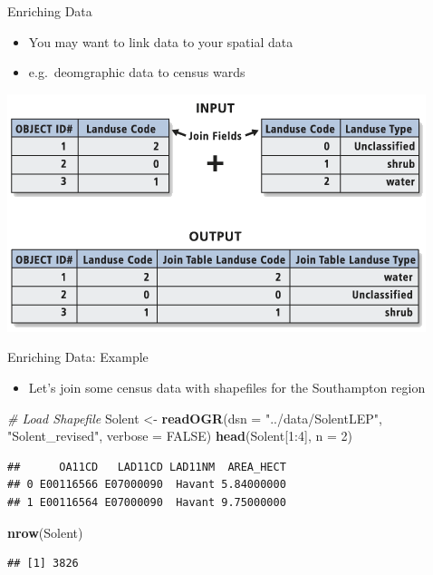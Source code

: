 \documentclass[10pt,ignorenonframetext,]{beamer}
\newenvironment{Shaded}{\begin{snugshade}}{\end{snugshade}}
\newcommand{\KeywordTok}[1]{\textcolor[rgb]{0.13,0.29,0.53}{\textbf{{#1}}}}
\newcommand{\DataTypeTok}[1]{\textcolor[rgb]{0.13,0.29,0.53}{{#1}}}
\newcommand{\DecValTok}[1]{\textcolor[rgb]{0.00,0.00,0.81}{{#1}}}
\newcommand{\StringTok}[1]{\textcolor[rgb]{0.31,0.60,0.02}{{#1}}}
\newcommand{\CommentTok}[1]{\textcolor[rgb]{0.56,0.35,0.01}{\textit{{#1}}}}
\newcommand{\OtherTok}[1]{\textcolor[rgb]{0.56,0.35,0.01}{{#1}}}
\newcommand{\NormalTok}[1]{{#1}}
\providecommand{\tightlist}{%
  \setlength{\itemsep}{0pt}\setlength{\parskip}{0pt}}
\begin{document}
\begin{frame}{Enriching Data}

\begin{itemize}
\tightlist
\item
  You may want to link data to your spatial data
\item
  e.g.~deomgraphic data to census wards
\end{itemize}

\begin{center}\includegraphics[width=0.8\linewidth]{../images/Join} \end{center}

\end{frame}

\begin{frame}[fragile]{Enriching Data: Example}

\begin{itemize}
\tightlist
\item
  Let's join some census data with shapefiles for the Southampton region
\end{itemize}

\begin{Shaded}
\begin{Highlighting}[]
\CommentTok{# Load Shapefile}
\NormalTok{Solent <-}\StringTok{ }\KeywordTok{readOGR}\NormalTok{(}\DataTypeTok{dsn =} \StringTok{"../data/SolentLEP"}\NormalTok{, }\StringTok{"Solent_revised"}\NormalTok{, }
    \DataTypeTok{verbose =} \OtherTok{FALSE}\NormalTok{)}
\KeywordTok{head}\NormalTok{(Solent[}\DecValTok{1}\NormalTok{:}\DecValTok{4}\NormalTok{], }\DataTypeTok{n =} \DecValTok{2}\NormalTok{)}
\end{Highlighting}
\end{Shaded}

\begin{verbatim}
##      OA11CD   LAD11CD LAD11NM  AREA_HECT
## 0 E00116566 E07000090  Havant 5.84000000
## 1 E00116564 E07000090  Havant 9.75000000
\end{verbatim}

\begin{Shaded}
\begin{Highlighting}[]
\KeywordTok{nrow}\NormalTok{(Solent)}
\end{Highlighting}
\end{Shaded}

\begin{verbatim}
## [1] 3826
\end{verbatim}

\end{frame}
\end{document}

